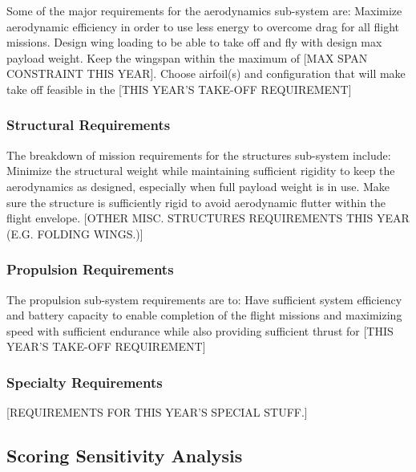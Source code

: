 \documentclass[report]{byu-aero}
\begin{document}
Some of the major requirements for the aerodynamics sub-system are: Maximize aerodynamic efficiency in order to use less energy to overcome drag for all flight missions.  Design wing loading to be able to take off and fly with design max payload weight.  Keep the wingspan within the maximum of {\color{BYUred}[MAX SPAN CONSTRAINT THIS YEAR]}.  Choose airfoil(s) and configuration that will make take off feasible in the {\color{BYUred}[THIS YEAR'S TAKE-OFF REQUIREMENT]}

\subsubsection{Structural Requirements}
\label{sssec:StructuralReqs}

The breakdown of mission requirements for the structures sub-system include: Minimize the structural weight while maintaining sufficient rigidity to keep the aerodynamics as designed, especially when full payload weight is in use.  Make sure the structure is sufficiently rigid to avoid aerodynamic flutter within the flight envelope. {\color{BYUred}[OTHER MISC. STRUCTURES REQUIREMENTS THIS YEAR (E.G. FOLDING WINGS.)]}

\subsubsection{Propulsion Requirements}
\label{sssec:PropulsionReqs}

The propulsion sub-system requirements are to: Have sufficient system efficiency and battery capacity to enable completion of the flight missions and maximizing speed with sufficient endurance while also providing sufficient thrust for {\color{BYUred}[THIS YEAR'S TAKE-OFF REQUIREMENT]}

\subsubsection{Specialty Requirements} %
\label{sssec:SpecialReqs}

{\color{BYUred}[REQUIREMENTS FOR THIS YEAR'S SPECIAL STUFF.]} 
\lipsum[2]




\subsection{Scoring Sensitivity Analysis}
\label{ssec:SensitivityStudy}
\end{document}
